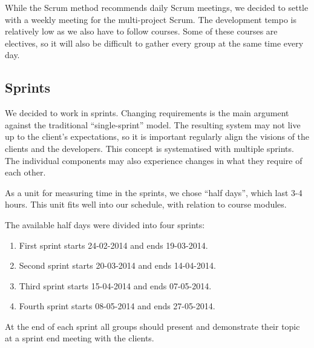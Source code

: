 While the Scrum method recommends daily Scrum meetings, we decided to settle with a weekly meeting for the multi-project Scrum. The development tempo is relatively low as we also have to follow courses. Some of these courses are electives, so it will also be difficult to gather every group at the same time every day.

\subsection{Sprints}
We decided to work in sprints. Changing requirements is the main argument against the traditional ``single-sprint'' model. The resulting system may not live up to the client's expectations, so it is important regularly align the visions of the clients and the developers. This concept is systematised with multiple sprints. The individual components may also experience changes in what they require of each other.

As a unit for measuring time in the sprints, we chose ``half days'', which last 3-4 hours. This unit fits well into our schedule, with relation to course modules.

The available half days were divided into four sprints:

\begin{enumerate}
\item First sprint starts 24-02-2014 and ends 19-03-2014.
\item Second sprint starts 20-03-2014 and ends 14-04-2014.
\item Third sprint starts 15-04-2014 and ends 07-05-2014.
\item Fourth sprint starts 08-05-2014 and ends 27-05-2014.
\end{enumerate}

At the end of each sprint all groups should present and demonstrate their topic at a sprint end meeting with the clients.
